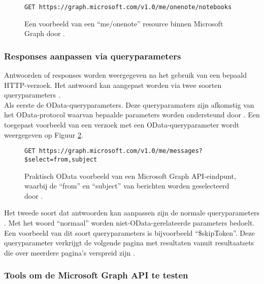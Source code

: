 \begin{figure}[h]
    \scriptsize
    \begin{verbatim}
GET https://graph.microsoft.com/v1.0/me/onenote/notebooks
    \end{verbatim}    
    \caption[Voorbeeld Microsoft Graph resource]{Een voorbeeld van een “me/onenote” resource binnen Microsoft Graph door \textcite{Microsoft2022e}.}
    \label{MSGR}
\end{figure}



\subsubsection{Responses aanpassen via queryparameters}

Antwoorden of responses worden weergegeven na het gebruik van een bepaald \ac{HTTP}-verzoek. Het antwoord kan aangepast worden via twee soorten queryparameters \autocite{Microsoft2023vv}. \\

Als eerste de OData-queryparameters. Deze queryparamaters zijn afkomstig van het OData-protocol waarvan bepaalde parameters worden ondersteund door \textcite{Microsoft2023g}. Een toegepast voorbeeld van een verzoek met een OData-queryparameter wordt weergegeven op Figuur \ref{TRAM}. \\

\begin{figure}[h]
    \scriptsize
    \begin{verbatim}
GET https://graph.microsoft.com/v1.0/me/messages?$select=from,subject
    \end{verbatim}    
    \caption[Voorbeeld OData HTTP-verzoek]{Praktisch OData voorbeeld van een Microsoft Graph \Ac{API}-eindpunt, waarbij de “from” en “subject” van berichten worden geselecteerd door \textcite{Microsoft2022e}.}
    \label{TRAM}
\end{figure}

Het tweede soort dat antwoorden kan aanpassen zijn de normale queryparameters \autocite{Microsoft2023vv}. Met het woord “normaal” worden niet-OData-gerelateerde parameters bedoelt. Een voorbeeld van dit soort queryparameters is bijvoorbeeld “\$skipToken”. Deze queryparameter verkrijgt de volgende pagina met resultaten vanuit resultaatsets die over meerdere pagina's verspreid zijn \textcite{Microsoft2023g}. 

\subsubsection{Tools om de Microsoft Graph API te testen}

